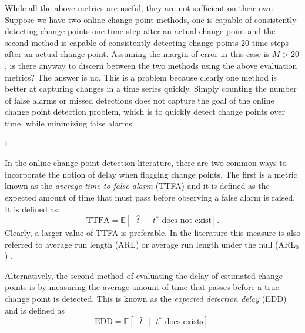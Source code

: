 While all the above metrics are useful, they are not sufficient on their own. Suppose we have two online change point methods, one is capable of consistently detecting change points one time-step after an actual change point and the second method is capable of consistently detecting change points 20 time-steps after an actual change point. Assuming the margin of error in this case is $M>20$, is there anyway to discern between the two methods using the above evaluation metrics?  The answer is no. This is a problem because clearly one method is better at capturing changes in a time series quickly. Simply counting the number of false alarms or missed detections does not capture the goal of the online change point detection problem, which is to quickly detect change points over time, while minimizing false alarms. 
 

I%

In the online change point detection literature, there are two common ways to incorporate the notion of delay when flagging change points. The first is a metric known as the \textit{average time to false alarm} (TTFA) and it is defined as 
the expected amount of time that must pass before observing a false alarm is raised. It is defined as:
\begin{equation}
\label{ttfa}
\text{TTFA} = \mathbb{E}[\text{ }  \hat{t} \text{ } |\text{ }  t^* \text{ does not exist} ].
\end{equation}
Clearly, a larger value of TTFA is preferable. In the literature this measure is also referred to average run length (ARL) or average run length under the null (ARL$_0$) \cite{johnson2017detecting}. 

Alternatively, the second method of evaluating the delay of estimated change points is by measuring the average amount of time that passes before a true change point is detected. This is known as the \textit{expected detection delay} (EDD) and is defined as 
\begin{equation}
\label{edd}
\text{EDD} = \mathbb{E}[\text{ }  \hat{t} \text{ } |\text{ }  t^* \text{ does exists} ].
\end{equation}

